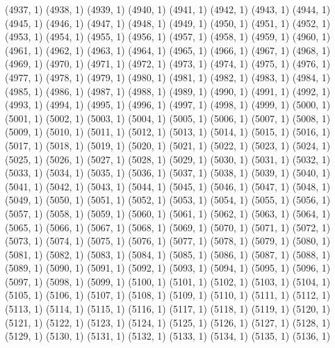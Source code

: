 {   (4937, 1)
   (4938, 1)
   (4939, 1)
   (4940, 1)
   (4941, 1)
   (4942, 1)
   (4943, 1)
   (4944, 1)
   (4945, 1)
   (4946, 1)
   (4947, 1)
   (4948, 1)
   (4949, 1)
   (4950, 1)
   (4951, 1)
   (4952, 1)
   (4953, 1)
   (4954, 1)
   (4955, 1)
   (4956, 1)
   (4957, 1)
   (4958, 1)
   (4959, 1)
   (4960, 1)
   (4961, 1)
   (4962, 1)
   (4963, 1)
   (4964, 1)
   (4965, 1)
   (4966, 1)
   (4967, 1)
   (4968, 1)
   (4969, 1)
   (4970, 1)
   (4971, 1)
   (4972, 1)
   (4973, 1)
   (4974, 1)
   (4975, 1)
   (4976, 1)
   (4977, 1)
   (4978, 1)
   (4979, 1)
   (4980, 1)
   (4981, 1)
   (4982, 1)
   (4983, 1)
   (4984, 1)
   (4985, 1)
   (4986, 1)
   (4987, 1)
   (4988, 1)
   (4989, 1)
   (4990, 1)
   (4991, 1)
   (4992, 1)
   (4993, 1)
   (4994, 1)
   (4995, 1)
   (4996, 1)
   (4997, 1)
   (4998, 1)
   (4999, 1)
   (5000, 1)
   (5001, 1)
   (5002, 1)
   (5003, 1)
   (5004, 1)
   (5005, 1)
   (5006, 1)
   (5007, 1)
   (5008, 1)
   (5009, 1)
   (5010, 1)
   (5011, 1)
   (5012, 1)
   (5013, 1)
   (5014, 1)
   (5015, 1)
   (5016, 1)
   (5017, 1)
   (5018, 1)
   (5019, 1)
   (5020, 1)
   (5021, 1)
   (5022, 1)
   (5023, 1)
   (5024, 1)
   (5025, 1)
   (5026, 1)
   (5027, 1)
   (5028, 1)
   (5029, 1)
   (5030, 1)
   (5031, 1)
   (5032, 1)
   (5033, 1)
   (5034, 1)
   (5035, 1)
   (5036, 1)
   (5037, 1)
   (5038, 1)
   (5039, 1)
   (5040, 1)
   (5041, 1)
   (5042, 1)
   (5043, 1)
   (5044, 1)
   (5045, 1)
   (5046, 1)
   (5047, 1)
   (5048, 1)
   (5049, 1)
   (5050, 1)
   (5051, 1)
   (5052, 1)
   (5053, 1)
   (5054, 1)
   (5055, 1)
   (5056, 1)
   (5057, 1)
   (5058, 1)
   (5059, 1)
   (5060, 1)
   (5061, 1)
   (5062, 1)
   (5063, 1)
   (5064, 1)
   (5065, 1)
   (5066, 1)
   (5067, 1)
   (5068, 1)
   (5069, 1)
   (5070, 1)
   (5071, 1)
   (5072, 1)
   (5073, 1)
   (5074, 1)
   (5075, 1)
   (5076, 1)
   (5077, 1)
   (5078, 1)
   (5079, 1)
   (5080, 1)
   (5081, 1)
   (5082, 1)
   (5083, 1)
   (5084, 1)
   (5085, 1)
   (5086, 1)
   (5087, 1)
   (5088, 1)
   (5089, 1)
   (5090, 1)
   (5091, 1)
   (5092, 1)
   (5093, 1)
   (5094, 1)
   (5095, 1)
   (5096, 1)
   (5097, 1)
   (5098, 1)
   (5099, 1)
   (5100, 1)
   (5101, 1)
   (5102, 1)
   (5103, 1)
   (5104, 1)
   (5105, 1)
   (5106, 1)
   (5107, 1)
   (5108, 1)
   (5109, 1)
   (5110, 1)
   (5111, 1)
   (5112, 1)
   (5113, 1)
   (5114, 1)
   (5115, 1)
   (5116, 1)
   (5117, 1)
   (5118, 1)
   (5119, 1)
   (5120, 1)
   (5121, 1)
   (5122, 1)
   (5123, 1)
   (5124, 1)
   (5125, 1)
   (5126, 1)
   (5127, 1)
   (5128, 1)
   (5129, 1)
   (5130, 1)
   (5131, 1)
   (5132, 1)
   (5133, 1)
   (5134, 1)
   (5135, 1)
   (5136, 1)
}
